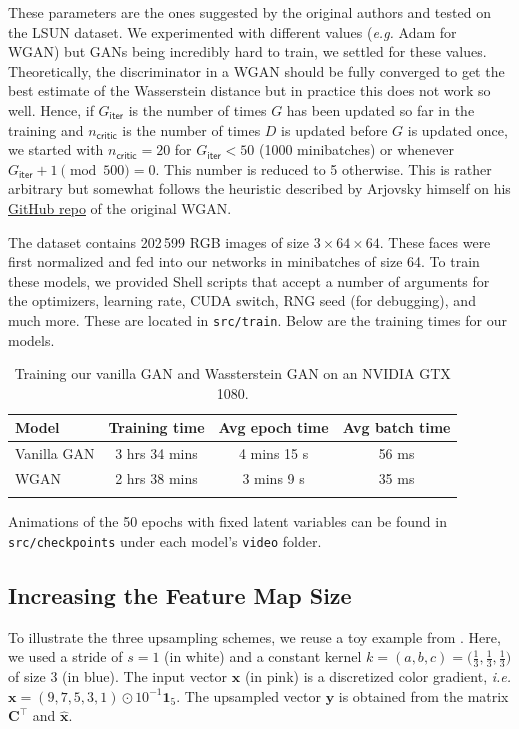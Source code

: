 \documentclass[table]{article}
\def\*#1{\mathbf{#1}}
\newcommand{\code}[1]{{\color{Blue}\small\texttt{#1}}}
\begin{document}
These parameters are the ones suggested by the original authors and tested on the LSUN dataset. We experimented with different values (\textit{e.g.} Adam for WGAN) but GANs being incredibly hard to train, we settled for these values. Theoretically, the discriminator in a WGAN should be fully converged to get the best estimate of the Wasserstein distance but in practice this does not work so well. Hence, if $G_\textsf{iter}$ is the number of times $G$ has been updated so far in the training and $n_\textsf{critic}$ is the number of times $D$ is updated before $G$ is updated once, we started with $n_\textsf{critic} = 20$ for $G_\textsf{iter} < 50$ (1000 minibatches) or whenever $G_\textsf{iter}+1 \pmod{500} = 0$. This number is reduced to 5 otherwise. This is rather arbitrary but somewhat follows the heuristic described by Arjovsky himself on his \href{https://github.com/martinarjovsky/wassersteingan}{GitHub repo} of the original WGAN.

The dataset contains 202\,599 RGB images of size $3 \times 64 \times 64$. These faces were first normalized and fed into our networks in minibatches of size 64. To train these models, we provided Shell scripts that accept a number of arguments for the optimizers, learning rate, CUDA switch, RNG seed (for debugging), and much more. These are located in \code{src/train}. Below are the training times for our models.

\begin{table}[ht]
\centering
\begin{tabular}{l c c c}
\Xhline{2\arrayrulewidth}
Model & Training time & Avg epoch time & Avg batch time \\
\hline
Vanilla GAN & 3 hrs 34 mins & 4 mins 15 s & 56 ms  \\
WGAN & 2 hrs 38 mins & 3 mins 9 s & 35 ms \\
\Xhline{2\arrayrulewidth}
\end{tabular}
\caption{Training our vanilla GAN and Wassterstein GAN on an NVIDIA GTX 1080.}
\end{table}

Animations of the 50 epochs with fixed latent variables can be found in \code{src/checkpoints} under each model's \code{video} folder.

\subsection{Increasing the Feature Map Size}

To illustrate the three upsampling schemes, we reuse a toy example from \cite{odena2016deconvolution}. Here, we used a stride of $s=1$ (in white) and a constant kernel $k=(a,b,c) = \big(\frac{1}{3}, \frac{1}{3},\frac{1}{3}\big)$ of size 3 (in blue). The input vector $\*x$ (in pink) is a discretized color gradient, \textit{i.e.} $\*x = (9,7,5,3,1) \odot 10^{-1} \*1_5$. The upsampled vector $\*y$ is obtained from the matrix $\*C^\top$ and $\*{\hat x}$.
\end{document}
